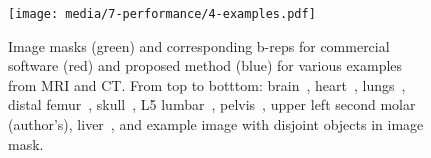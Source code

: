 \begin{figure}[ht!]
	\centering
	\texttt{[image: media/7-performance/4-examples.pdf]}
	\caption{Image masks (green) and corresponding b-reps for commercial software (red) and proposed method (blue) for various examples from MRI and CT. From top to botttom: brain~\cite{marcus_2007}, heart~\cite{winslow_2012}, lungs~\cite{rikxoort_2009}, distal femur~\cite{epperson_2013}, skull~\cite{clark_2013}, L5 lumbar~\cite{yao_2016}, pelvis~\cite{clark_2013}, upper left second molar (author's), liver~\cite{bilic_2019}, and example image with disjoint objects in image mask.}
	\label{fig:example-meshes}
\end{figure}